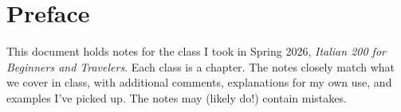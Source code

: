 
\chapter{Preface}
This document holds notes for the class I took in Spring 2026, \textit{Italian 200 for 
Beginners and Travelers}. Each class is a chapter. The notes closely match what we cover in 
class, with additional comments, explanations for my own use, and examples I've picked up. 
The notes may (likely do!) contain mistakes.

